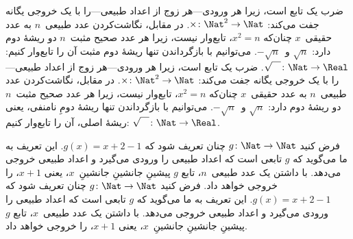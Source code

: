 \ExplSyntaxOff

 {
  ضرب یک تابع است، زیرا هر ورودی---هر زوج
  از اعداد طبیعی---را با یک خروجی یگانه جفت می‌کند: $\times \colon \Nat^2 \to
  \Nat$. در مقابل، نگاشت‌کردن عدد طبیعی~$n$ به عدد حقیقی~$x$ چنان‌که
  $x^2 = n$، تابع‌وار نیست، زیرا هر عدد صحیح مثبت~$n$ دو
  ریشهٔ دوم دارد: $\sqrt{n}$ و~$-\sqrt{n}$. می‌توانیم با
  بازگرداندن تنها ریشهٔ دوم مثبت آن را تابع‌وار کنیم: $\sqrt{\phantom{X}} \colon
  \Nat \to \Real$.
 }
 {
  ضرب یک تابع است، زیرا هر ورودی---هر زوج
  از اعداد طبیعی---را با یک خروجی یگانه جفت می‌کند: $\times \colon \Nat^2 \to
  \Nat$. در مقابل، نگاشت‌کردن عدد طبیعی~$n$ به عدد حقیقی~$x$ چنان‌که
  $x^2 = n$، تابع‌وار نیست، زیرا هر عدد صحیح مثبت~$n$ دو
  ریشهٔ دوم دارد: $\sqrt{n}$ و~$-\sqrt{n}$. می‌توانیم با
  بازگرداندن تنها ریشهٔ دومِ نامنفی، یعنی ریشهٔ اصلی، آن را تابع‌وار کنیم:
  $\sqrt{\phantom{X}} \colon \Nat \to \Real$.
 }

 {
  فرض کنید $g \colon \Nat \to \Nat$ چنان تعریف شود که $g(x) = x+2-1$. این
  تعریف به ما می‌گوید که $g$ تابعی است که اعداد طبیعی را ورودی می‌گیرد و
  اعداد طبیعی خروجی می‌دهد. با داشتن یک عدد طبیعی~$n$، تابع $g$
  پیشینِ جانشینِ جانشینِ~$x$، یعنی
  $x+1$، را خروجی خواهد داد.
 }
 {
  فرض کنید $g \colon \Nat \to \Nat$ چنان تعریف شود که $g(x) = x+2-1$. این
  تعریف به ما می‌گوید که $g$ تابعی است که اعداد طبیعی را ورودی می‌گیرد و
  اعداد طبیعی خروجی می‌دهد. با داشتن یک عدد طبیعی~$x$، تابع $g$
  پیشینِ جانشینِ جانشینِ~$x$، یعنی
  $x+1$، را خروجی خواهد داد.
 }

